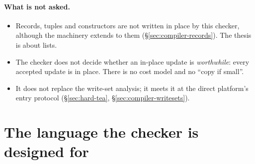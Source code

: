 \paragraph{What is not asked.}
\begin{itemize}
\item Records, tuples and constructors are not written in place by this checker, although the
machinery extends to them (\S\ref{sec:compiler-records}). The thesis is about lists.
\item The checker does not decide whether an in-place update is \emph{worthwhile}: every accepted
update is in place. There is no cost model and no ``copy if small''.
\item It does not replace the write-set analysis; it meets it at the direct platform's entry
protocol (\S\ref{sec:hard-tea}, \S\ref{sec:compiler-writesets}).
\end{itemize}

\section{The language the checker is designed for}
\label{sec:bg-language}

